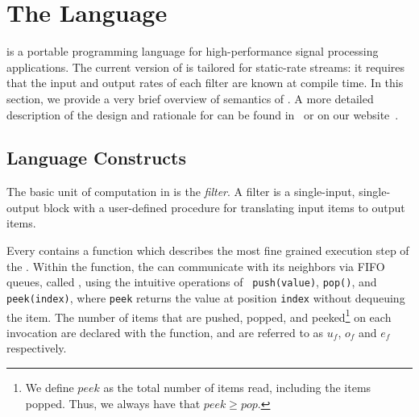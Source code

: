 \section{The \StreamIt Language}
\label{sec:streamit}

\StreamIt is a portable programming language for high-performance
signal processing applications.  The current version of \StreamIt
is tailored for static-rate streams: it requires that the input
and output rates of each filter are known at compile time.  In
this section, we provide a very brief overview of
semantics of \StreamIt.  A more detailed description of the design
and rationale for \StreamIt can be found in~\cite{streamitcc} or
on our website~\cite{streamitweb}.

\subsection{Language Constructs}

The basic unit of computation in \StreamIt is the {\it filter}.  A
filter is a single-input, single-output block with a user-defined
procedure for translating input items to output items.
\begin{comment}
An example of a filter is the {\tt FIRFilter}, a component of our
software radio (see Figure \ref{fig:radiocode}). Each filter
contains an {\tt init} function that is called at initialization
time; in this case, the {\tt FIRFilter} calculates {\tt weights},
which represents its impulse response.
\end{comment}
Every \filter contains a \work function which describes the most
fine grained execution step of the \filter. Within the \work
function, the \filter can communicate with its neighbors via FIFO
queues, called \Channels, using the intuitive operations of {\tt
push(value)}, {\tt pop()}, and {\tt peek(index)}, where {\tt peek}
returns the value at position {\tt index} without dequeuing the
item.  The number of items that are pushed, popped, and
peeked\footnote{We define $peek$ as the total number of items
read, including the items popped.  Thus, we always have that $peek
\ge pop$.} on each invocation are declared with the \work
function, and are referred to as $u_f$, $o_f$ and $e_f$
respectively.

\begin{comment}
In addition to {\tt work}, a filter can contain a {\tt prework}
function that is executed exactly once between initialization and
the steady-state.  Like {\tt work}, {\tt prework} can access the
input and output tapes of the filter; however, the I/O rates of
{\tt work} and {\tt prework} can differ. In an {\tt FIRFilter}, a
{\tt prework} function is essential for correctly filtering the
beginning of the input stream.  The user never calls the {\tt
init}, {\tt prework}, and {\tt work} functions--they are all
called automatically.
\end{comment}

